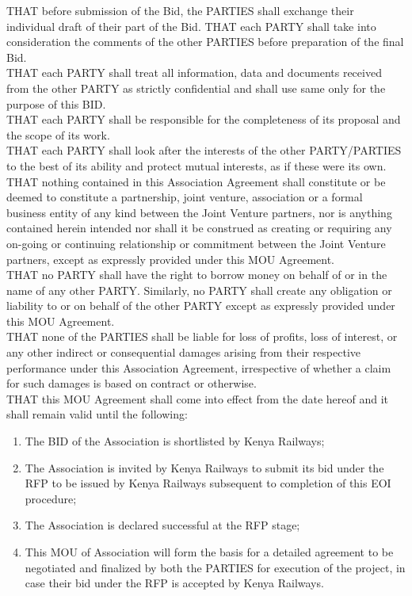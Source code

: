 THAT  before submission of the Bid, the PARTIES  shall exchange their individual draft of their part of the Bid. THAT each PARTY shall take into consideration the comments of the other PARTIES before preparation of the final Bid.\\

THAT each PARTY shall treat all information, data and documents received from the other PARTY as strictly confidential and shall use same only for the purpose of this BID. \\

THAT each PARTY shall be responsible for the completeness of its proposal and the scope of its work.\\

THAT each PARTY shall look after the interests of the other PARTY/PARTIES to the best of its ability and protect mutual interests, as if these were its own.\\

THAT nothing contained in this Association Agreement shall constitute or be deemed to constitute a partnership, joint venture, association or a formal business entity of any kind between the Joint Venture partners, nor is anything contained herein intended nor shall it be construed as creating or requiring any on-going or continuing relationship or commitment between the Joint Venture partners, except as expressly provided under this MOU Agreement.\\

THAT no PARTY shall have the right to borrow money on behalf of or in the name of any other PARTY. Similarly, no PARTY shall create any obligation or liability to or on behalf of the other PARTY except as expressly provided under this MOU Agreement.\\

THAT none of the PARTIES shall be liable for loss of profits, loss of interest, or any other indirect or consequential damages arising from their respective performance under this Association Agreement, irrespective of whether a claim for such damages is based on contract or otherwise.\\

THAT this MOU Agreement shall come into effect from the date hereof and it shall remain valid until the following:\\

	\begin{enumerate}
		\item The BID of the Association is shortlisted by Kenya Railways;
		\item    The Association is invited by Kenya Railways to submit its bid under the RFP to be   issued by Kenya Railways subsequent to completion of this EOI procedure;
		\item The  Association is declared successful at the RFP stage;
		\item This MOU of Association will form the basis for a detailed agreement to be negotiated and finalized by both the PARTIES for execution of the project, in case their bid under the RFP is accepted by Kenya Railways.
	\end{enumerate}

